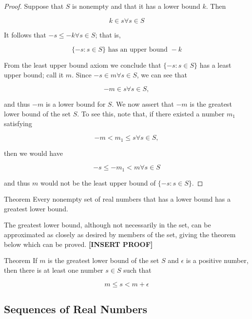         \begin{proof}
            Suppose that $S$ is nonempty and that it has a lower bound $k$. Then

            \[
                k \in s \forall s \in S
            \]

            It follows that $-s \leq -k\forall s \in S$; that is,

            \[
                \{-s : s \in S \} \text{ has an upper bound } - k
            \]

            From the least upper bound axiom we conclude that $\{-s:s\in S\}$ has a least upper bound; call it $m$. Since $-s\in m\forall s \in S$, we can see that

            \[
                -m \in s \forall s \in S,
            \]

            and thus $-m$ is a lower bound for $S$. We now assert that $-m$ is the greatest lower bound of the set $S$. To see this, note that, if there existed a number $m_1$ satisfying

            \[
                -m < m_1 \leq s \forall s \in S,
            \]

            then we would have

            \[
                -s \leq -m_1 < m \forall s \in S
            \]

            and thus $m$ would not be the least upper bound of $\{-s:s\in S\}$.
        \end{proof}

        \begin{theorem}{Theorem}
            Every nonempty set of real numbers that has a lower bound has a greatest lower bound.
        \end{theorem}

        The greatest lower bound, although not necessarily in the set, can be approximated as closely as desired by members of the set, giving the theorem below which can be proved. \textbf{[INSERT PROOF]}

        \begin{theorem}{Theorem}
            If $m$ is the greatest lower bound of the set $S$ and $\epsilon$ is a positive number, then there is at least one number $s\in S$ such that

            \[
                m \leq s < m + \epsilon
            \]
        \end{theorem}

    \subsection{Sequences of Real Numbers}      %

